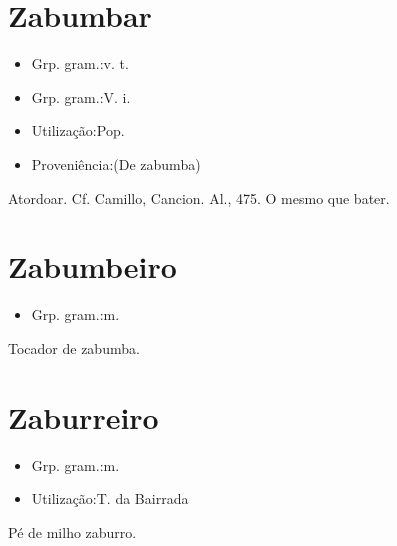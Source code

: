 \section{Zabumbar}
\begin{itemize}
\item {Grp. gram.:v. t.}
\end{itemize}
\begin{itemize}
\item {Grp. gram.:V. i.}
\end{itemize}
\begin{itemize}
\item {Utilização:Pop.}
\end{itemize}
\begin{itemize}
\item {Proveniência:(De \textunderscore zabumba\textunderscore )}
\end{itemize}
Atordoar. Cf. Camillo, \textunderscore Cancion. Al.\textunderscore , 475.
O mesmo que \textunderscore bater\textunderscore .
\section{Zabumbeiro}
\begin{itemize}
\item {Grp. gram.:m.}
\end{itemize}
Tocador de zabumba.
\section{Zaburreiro}
\begin{itemize}
\item {Grp. gram.:m.}
\end{itemize}
\begin{itemize}
\item {Utilização:T. da Bairrada}
\end{itemize}
Pé de milho zaburro.
